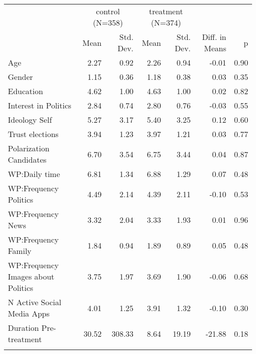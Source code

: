 \begin{table}

\caption{}
\centering
\begin{tabular}[t]{lrrrrrr}
\toprule
\multicolumn{1}{c}{ } & \multicolumn{2}{c}{control (N=358)} & \multicolumn{2}{c}{treatment (N=374)} & \multicolumn{2}{c}{ } \\
\cmidrule(l{3pt}r{3pt}){2-3} \cmidrule(l{3pt}r{3pt}){4-5}
  & Mean & Std. Dev. & Mean & Std. Dev. & Diff. in Means & p\\
\midrule
Age & 2.27 & 0.92 & 2.26 & 0.94 & -0.01 & 0.90\\
Gender & 1.15 & 0.36 & 1.18 & 0.38 & 0.03 & 0.35\\
Education & 4.62 & 1.00 & 4.63 & 1.00 & 0.02 & 0.82\\
Interest in Politics & 2.84 & 0.74 & 2.80 & 0.76 & -0.03 & 0.55\\
Ideology Self & 5.27 & 3.17 & 5.40 & 3.25 & 0.12 & 0.60\\
Trust elections & 3.94 & 1.23 & 3.97 & 1.21 & 0.03 & 0.77\\
Polarization Candidates & 6.70 & 3.54 & 6.75 & 3.44 & 0.04 & 0.87\\
WP:Daily time & 6.81 & 1.34 & 6.88 & 1.29 & 0.07 & 0.48\\
WP:Frequency Politics & 4.49 & 2.14 & 4.39 & 2.11 & -0.10 & 0.53\\
WP:Frequency News & 3.32 & 2.04 & 3.33 & 1.93 & 0.01 & 0.96\\
WP:Frequency Family & 1.84 & 0.94 & 1.89 & 0.89 & 0.05 & 0.48\\
WP:Frequency Images about Politics & 3.75 & 1.97 & 3.69 & 1.90 & -0.06 & 0.68\\
N Active Social Media Apps & 4.01 & 1.25 & 3.91 & 1.32 & -0.10 & 0.30\\
Duration Pre-treatment & 30.52 & 308.33 & 8.64 & 19.19 & -21.88 & 0.18\\
\bottomrule
\multicolumn{7}{l}{\rule{0pt}{1em}}\\
\end{tabular}
\end{table}
